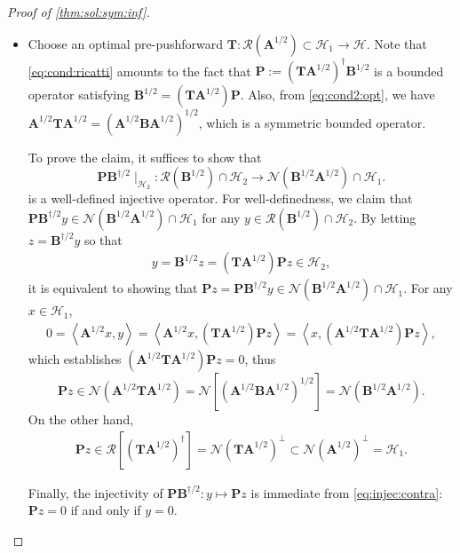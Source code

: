 \documentclass[noinfoline]{imsart}\setcounter{tocdepth}{2}
\newcommand{\m}[1]{\mathbf{#1}} %
\renewcommand{\c}[1]{\mathcal{#1}} %
\newcommand{\innpr}[2]{{\left\langle {#1},{#2}\right\rangle}} %
\theoremstyle{plain}
\begin{document}
\begin{proof}[Proof of \cref{thm:sol:sym:inf}]
\quad
\begin{itemize}[leftmargin = *]
\item [($\Rightarrow$)] Choose an optimal pre-pushforward $\m{T}: \c{R}(\m{A}^{1/2}) \subset \c{H}_{1} \rightarrow \c{H}$. Note that \eqref{eq:cond:ricatti} amounts to the fact that $\m{P} := (\m{T} \m{A}^{1/2})^{\dagger} \m{B}^{1/2}$ is a bounded operator satisfying $\m{B}^{1/2} = (\m{T} \m{A}^{1/2}) \m{P}$. Also, from \eqref{eq:cond2:opt}, we have $\m{A}^{1/2} \m{T} \m{A}^{1/2} = (\m{A}^{1/2} \m{B} \m{A}^{1/2})^{1/2}$, which is a symmetric bounded operator.

To prove the claim, it suffices to show that
\begin{equation*}
    \m{P} \m{B}^{\dagger/2} \mid_{\c{H}_{2}} : \c{R}(\m{B}^{1/2}) \cap \c{H}_{2} \rightarrow \c{N}(\m{B}^{1/2} \m{A}^{1/2}) \cap \c{H}_{1}.
\end{equation*}
is a well-defined injective operator. For well-definedness, we claim that $\m{P} \m{B}^{\dagger/2} y \in \c{N}(\m{B}^{1/2} \m{A}^{1/2}) \cap \c{H}_{1}$ for any $y \in \c{R}(\m{B}^{1/2}) \cap \c{H}_{2}$. By letting $z = \m{B}^{\dagger/2} y$ so that
\begin{align}\label{eq:injec:contra}
    y = \m{B}^{1/2} z = (\m{T} \m{A}^{1/2}) \m{P} z \in \c{H}_{2},
\end{align}
it is equivalent to showing that $\m{P} z = \m{P} \m{B}^{\dagger/2} y \in \c{N}(\m{B}^{1/2} \m{A}^{1/2}) \cap \c{H}_{1}$. For any $x \in \c{H}_{1}$,
\begin{align*}
    0 = \innpr{\m{A}^{1/2} x}{y} = \innpr{\m{A}^{1/2} x}{(\m{T} \m{A}^{1/2}) \m{P} z}
    = \innpr{x}{(\m{A}^{1/2} \m{T} \m{A}^{1/2}) \m{P} z},
\end{align*}
which establishes $(\m{A}^{1/2} \m{T} \m{A}^{1/2}) \m{P} z  = 0$, thus 
\begin{equation*}
    \m{P} z \in \c{N} (\m{A}^{1/2} \m{T} \m{A}^{1/2}) = \c{N}[(\m{A}^{1/2} \m{B} \m{A}^{1/2})^{1/2}] = \c{N}(\m{B}^{1/2} \m{A}^{1/2}).
\end{equation*}
On the other hand,
\begin{align*}
    \m{P} z \in \c{R}[(\m{T} \m{A}^{1/2})^{\dagger}] = \c{N}(\m{T} \m{A}^{1/2})^{\perp} \subset \c{N}(\m{A}^{1/2})^{\perp} = \c{H}_{1}.
\end{align*}

Finally, the injectivity of $\m{P} \m{B}^{\dagger/2}: y \mapsto \m{P} z$ is immediate from \eqref{eq:injec:contra}: $\m{P} z = 0$ if and only if $y = 0$.


\end{itemize}
\end{proof}
\end{document}
